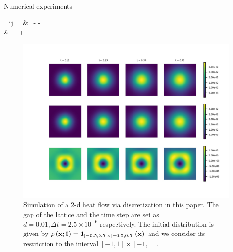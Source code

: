 \documentclass{beamer}
\begin{document}
\begin{frame}{Numerical experiments}
\scriptsize
	\bequn
	\begin{aligned}
	_{ij} = & \ -  \lp {}\log {} - \log {} \rpt			\\
	& \ \left. \qquad + \log {} - \log {} \rp.
	\end{aligned}
\eequn
\begin{figure}[h]
  \centering
  \centerline{\includegraphics[width=0.7\linewidth]{heat2D.jpg}}
  \caption{\scriptsize{Simulation of a 2-d heat flow via discretization in this paper. The gap of the lattice and the time step are set as $d = 0.01, \Delta t = 2.5 \times 10^{-6}$ respectively. The initial distribution is given by $\rho\left( \mathbf{x}; 0 \right) = \mathbf{1}_{[-0.5, 0.5] \times [-0.5, 0.5]}\left( \mathbf{x} \right)$ and we consider its restriction to the interval $[-1, 1] \times [-1, 1]$.}}
\end{figure}
\end{frame}
\end{document}
